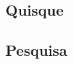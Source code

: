 \postextual



%

\begin{apendicesenv}
\partapendices

\chapter{Quisque}

\lipsum[50]



\end{apendicesenv}

\begin{anexosenv}
\partanexos

\chapter{Pesquisa}\label{anexo1}
%


\end{anexosenv}

